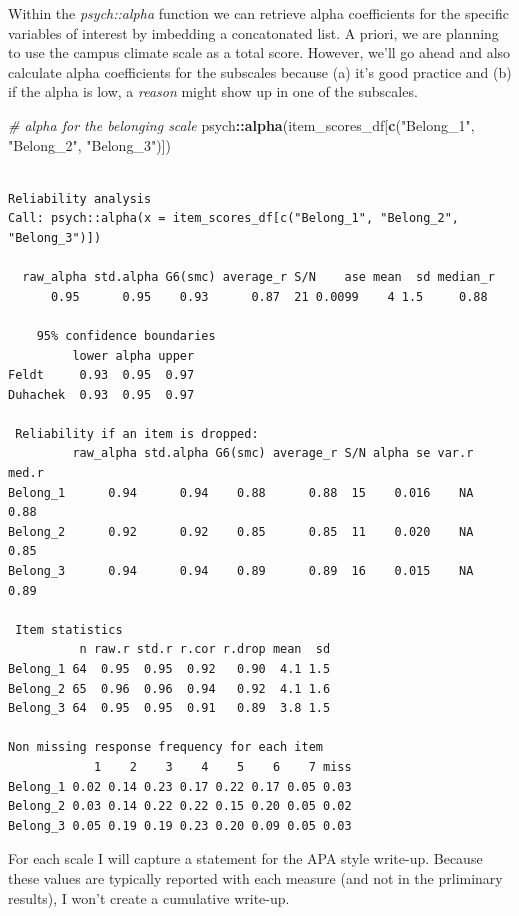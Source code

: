 \documentclass[
  11pt,
]{book}
\newenvironment{Shaded}{\begin{snugshade}}{\end{snugshade}}
\newcommand{\CommentTok}[1]{\textcolor[rgb]{0.37,0.37,0.37}{\textit{#1}}}
\newcommand{\FunctionTok}[1]{\textcolor[rgb]{0.27,0.27,0.27}{\textbf{#1}}}
\newcommand{\NormalTok}[1]{#1}
\newcommand{\SpecialCharTok}[1]{\textcolor[rgb]{0.43,0.43,0.43}{\textbf{#1}}}
\newcommand{\StringTok}[1]{\textcolor[rgb]{0.5,0.5,0.5}{#1}}
\begin{document}
Within the \emph{psych::alpha} function we can retrieve alpha coefficients for the specific variables of interest by imbedding a concatonated list. A priori, we are planning to use the campus climate scale as a total score. However, we'll go ahead and also calculate alpha coefficients for the subscales because (a) it's good practice and (b) if the alpha is low, a \emph{reason} might show up in one of the subscales.

\begin{Shaded}
\begin{Highlighting}[]
\CommentTok{\# alpha for the belonging scale}
\NormalTok{psych}\SpecialCharTok{::}\FunctionTok{alpha}\NormalTok{(item\_scores\_df[}\FunctionTok{c}\NormalTok{(}\StringTok{"Belong\_1"}\NormalTok{, }\StringTok{"Belong\_2"}\NormalTok{, }\StringTok{"Belong\_3"}\NormalTok{)])}
\end{Highlighting}
\end{Shaded}

\begin{verbatim}

Reliability analysis   
Call: psych::alpha(x = item_scores_df[c("Belong_1", "Belong_2", "Belong_3")])

  raw_alpha std.alpha G6(smc) average_r S/N    ase mean  sd median_r
      0.95      0.95    0.93      0.87  21 0.0099    4 1.5     0.88

    95% confidence boundaries 
         lower alpha upper
Feldt     0.93  0.95  0.97
Duhachek  0.93  0.95  0.97

 Reliability if an item is dropped:
         raw_alpha std.alpha G6(smc) average_r S/N alpha se var.r med.r
Belong_1      0.94      0.94    0.88      0.88  15    0.016    NA  0.88
Belong_2      0.92      0.92    0.85      0.85  11    0.020    NA  0.85
Belong_3      0.94      0.94    0.89      0.89  16    0.015    NA  0.89

 Item statistics 
          n raw.r std.r r.cor r.drop mean  sd
Belong_1 64  0.95  0.95  0.92   0.90  4.1 1.5
Belong_2 65  0.96  0.96  0.94   0.92  4.1 1.6
Belong_3 64  0.95  0.95  0.91   0.89  3.8 1.5

Non missing response frequency for each item
            1    2    3    4    5    6    7 miss
Belong_1 0.02 0.14 0.23 0.17 0.22 0.17 0.05 0.03
Belong_2 0.03 0.14 0.22 0.22 0.15 0.20 0.05 0.02
Belong_3 0.05 0.19 0.19 0.23 0.20 0.09 0.05 0.03
\end{verbatim}

For each scale I will capture a statement for the APA style write-up. Because these values are typically reported with each measure (and not in the prliminary results), I won't create a cumulative write-up.
\end{document}
